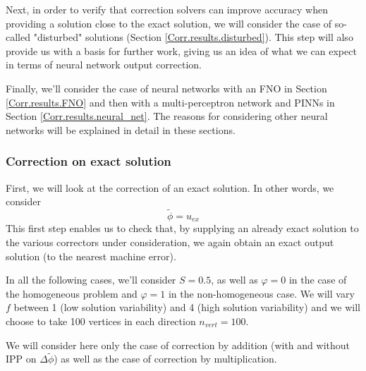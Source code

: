Next, in order to verify that correction solvers can improve accuracy when providing a solution close to the exact solution, we will consider the case of so-called "disturbed" solutions (Section \ref{Corr.results.disturbed}). This step will also provide us with a basis for further work, giving us an idea of what we can expect in terms of neural network output correction.

Finally, we'll consider the case of neural networks with an FNO in Section \ref{Corr.results.FNO} and then with a multi-perceptron network and PINNs in Section \ref{Corr.results.neural_net}. The reasons for considering other neural networks will be explained in detail in these sections.

\subsubsection{Correction on exact solution} \label{Corr.results.ana}

First, we will look at the correction of an exact solution. In other words, we consider
\begin{equation*}
	\tilde{\phi}=u_{ex}
\end{equation*}
This first step enables us to check that, by supplying an already exact solution to the various correctors under consideration, we again obtain an exact output solution (to the nearest machine error).

In all the following cases, we'll consider $S=0.5$, as well as $\varphi=0$ in the case of the homogeneous problem and $\varphi=1$ in the non-homogeneous case. We will vary $f$ between 1 (low solution variability) and 4 (high solution variability) and we will choose to take 100 vertices in each direction $n_{vert}=100$.

\begin{Rem}
	We will consider here only the case of correction by addition (with and without IPP on $\Delta\tilde{\phi}$) as well as the case of correction by multiplication.
\end{Rem}

